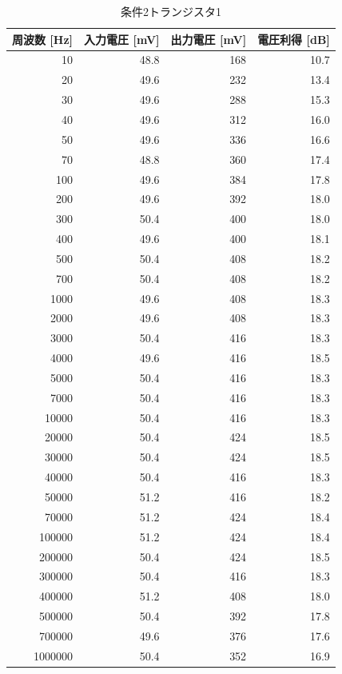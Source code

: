 \documentclass[a4paper,11pt,xelatex,ja=standard]{bxjsarticle}
\begin{document}
        \begin{table}[H]
            \centering
            \caption{条件2トランジスタ1}
            \begin{tabular}{rrrr}
                \hline
                周波数 [Hz] & 入力電圧 [mV] & 出力電圧 [mV] & 電圧利得 [dB] \\
                \hline\hline
                10 & 48.8 & 168 & 10.7 \\
                20 & 49.6 & 232 & 13.4 \\
                30 & 49.6 & 288 & 15.3 \\
                40 & 49.6 & 312 & 16.0 \\
                50 & 49.6 & 336 & 16.6 \\
                70 & 48.8 & 360 & 17.4 \\
                100 & 49.6 & 384 & 17.8 \\
                200 & 49.6 & 392 & 18.0 \\
                300 & 50.4 & 400 & 18.0 \\
                400 & 49.6 & 400 & 18.1 \\
                500 & 50.4 & 408 & 18.2 \\
                700 & 50.4 & 408 & 18.2 \\
                1000 & 49.6 & 408 & 18.3 \\
                2000 & 49.6 & 408 & 18.3 \\
                3000 & 50.4 & 416 & 18.3 \\
                4000 & 49.6 & 416 & 18.5 \\
                5000 & 50.4 & 416 & 18.3 \\
                7000 & 50.4 & 416 & 18.3 \\
                10000 & 50.4 & 416 & 18.3 \\
                20000 & 50.4 & 424 & 18.5 \\
                30000 & 50.4 & 424 & 18.5 \\
                40000 & 50.4 & 416 & 18.3 \\
                50000 & 51.2 & 416 & 18.2 \\
                70000 & 51.2 & 424 & 18.4 \\
                100000 & 51.2 & 424 & 18.4 \\
                200000 & 50.4 & 424 & 18.5 \\
                300000 & 50.4 & 416 & 18.3 \\
                400000 & 51.2 & 408 & 18.0 \\
                500000 & 50.4 & 392 & 17.8 \\
                700000 & 49.6 & 376 & 17.6 \\
                1000000 & 50.4 & 352 & 16.9 \\
                \hline
            \end{tabular}
        \end{table}
\end{document}
